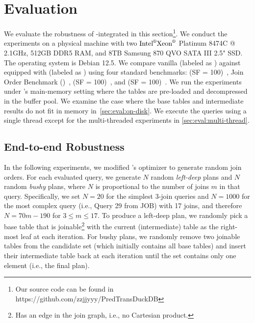 \section{Evaluation}
\label{sec:eval}

We evaluate the robustness of \rpt-integrated \duckdb in this section\footnote{Our source code can be found in https://github.com/zzjjyyy/PredTransDuckDB}. We conduct the experiments on a physical machine with two $\text{Intel}^\text{\textregistered} \text{Xeon}^\text{\textregistered}$ Platinum 8474C @ 2.1GHz, 512GB DDR5 RAM, and 8TB Samsung 870 QVO SATA III 2.5" SSD. The operating system is Debian 12.5. We compare vanilla \duckdb (labeled as \duckdb) against \duckdb equipped with \rpt (labeled as \rpt) using four standard benchmarks: \tpch (SF = 100)~\cite{TPCH}, Join Order Benchmark (\job)~\cite{JOB}, \tpcds (SF = 100)~\cite{TPCDS}, and \dsb (SF = 100)~\cite{DSB}. We run the experiments under \duckdb's main-memory setting where the tables are pre-loaded and decompressed in the buffer pool. We examine the case where the base tables and intermediate results do not fit in memory in~\cref{sec:eval:on-disk}. We execute the queries using a single thread except for the multi-threaded experiments in \cref{sec:eval:multi-thread}.

\subsection{End-to-end Robustness}
\label{sec:eval:end-to-end}

In the following experiments, we modified \duckdb's optimizer to generate random join orders. For each evaluated query, we generate $N$ random \emph{left-deep} plans and $N$ random \emph{bushy} plans, where $N$ is proportional to the number of joins $m$ in that query. Specifically, we set $N = 20$ for the simplest 3-join queries and $N = 1000$ for the most complex query (i.e., Query 29 from JOB) with 17 joins, and therefore $N = 70m - 190$ for $3 \le m \le 17$. To produce a left-deep plan, we randomly pick a base table that is joinable\footnote{Has an edge in the join graph, i.e., no Cartesian product.} with the current (intermediate) table as the right-most leaf at each iteration. For bushy plans, we randomly remove two joinable tables from the candidate set (which initially contains all base tables) and insert their intermediate table back at each iteration until the set contains only one element (i.e., the final plan). 


